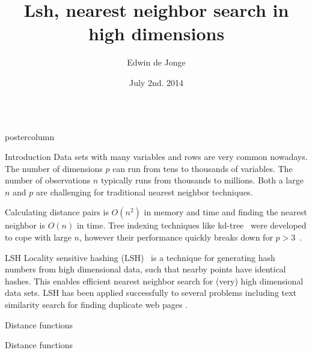 \documentclass[final,hyperref={pdfpagelabels=false}]{beamer}
\title{\huge Lsh, nearest neighbor search in high dimensions}
\author{Edwin de Jonge}
\institute[Statistics Netherlands]{Methodology Department, Statistics Netherlands, Den Haag, Netherlands}
\date[July. 2nd, 2014]{July 2nd. 2014}
\newlength{\columnheight}
\begin{document}
\begin{frame}
  \begin{columns}
    \begin{column}{.49\textwidth}
      \begin{beamercolorbox}[center,wd=\textwidth]{postercolumn}
        \begin{minipage}[T]{.95\textwidth}  %
          \parbox[t][\columnheight]{\textwidth}{ %
            \begin{block}{Introduction}
            Data sets with many variables and rows are very common nowadays. The number of dimensions $p$ can run from tens to thousands of variables. The number of observations $n$ typically runs from thousands to millions.
Both a large $n$ and $p$ are challenging for traditional nearest neighbor techniques.

Calculating distance pairs is $O(n^2)$ in memory and time and finding the nearest neighbor is $O(n)$ in time.
Tree indexing techniques like kd-tree~\citep{bentley1975} were developed to cope with large $n$, however their performance quickly breaks down for $p > 3$~\citep{datar2004}. 
            \end{block}
            \vfill
            \begin{block}{LSH}
Locality sensitive hashing (LSH)~\citep{datar2004} is a technique for generating hash numbers from high dimensional data, such 
that nearby points have identical hashes. This enables efficient nearest neighbor search for (very) high dimensional data sets. LSH has been applied successfully to several problems including text similarity search for finding duplicate web pages \citep{slaney2008}.
            \end{block}
            \vfill
            \begin{block}{Distance functions}
            \end{block}
            \vfill
            \begin{block}{Distance functions}
            \end{block}
          }
        \end{minipage}
      \end{beamercolorbox}
    \end{column}


\end{columns}
\end{frame}
\end{document}
